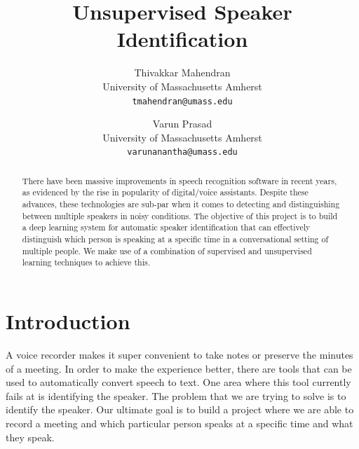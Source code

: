 \documentclass[10pt,twocolumn,letterpaper]{article}
\begin{document}
\title{Unsupervised Speaker Identification}

\author{Thivakkar Mahendran\\
University of Massachusetts Amherst\\
{\tt\small tmahendran@umass.edu}
\and
Varun Prasad\\
University of Massachusetts Amherst\\
{\tt\small varunanantha@umass.edu}
}

\maketitle

\begin{abstract}
   There have been massive improvements in speech recognition software in recent years, as evidenced by the rise in popularity of digital/voice assistants. Despite these advances, these technologies are sub-par when it comes to detecting and distinguishing between multiple speakers in noisy conditions. The objective of this project is to build a deep learning system for automatic speaker identification that can effectively distinguish which person is speaking at a specific time in a conversational setting of multiple people. We make use of a combination of supervised and unsupervised learning techniques to achieve this.
\end{abstract}



\section{Introduction}

A voice recorder makes it super convenient to take notes or preserve the minutes of a meeting. In order to make the experience better, there are tools that can be used to automatically convert speech to text. One area where this tool currently fails at is identifying the speaker. The problem that we are trying to solve is to identify the speaker. Our ultimate goal is to build a project where we are able to record a meeting and which particular person speaks at a specific time and what they speak.
\end{document}
